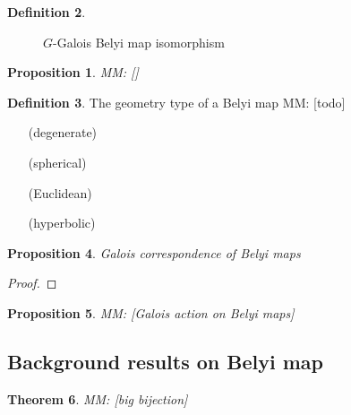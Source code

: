 \documentclass{dcthesis}
\newcommand{\PP}{\mathbb P}
\newcommand{\defi}[1]{\textsf{#1}}
\newcommand{\mm}[1]{{\color{blue} \sf MM: [#1]}}
\newtheorem{prop}{Proposition}[section]
\newtheorem{theorem}[prop]{Theorem}
\theoremstyle{definition}
\newtheorem{definition}[prop]{Definition}
\theoremstyle{remark}
\numberwithin{equation}{section}
\numberwithin{figure}{section}
\begin{document}
{{{\begin{definition}
        \begin{figure}[ht]
          \begin{center}
          \end{center}
          \caption{$G$-Galois Belyi map isomorphism}
          \label{fig:Gbelyiiso}
        \end{figure}
        \begin{prop}\label{prop:Gauts}
          \mm{\cite[Prop. 3.6 ish]{triangles}}
        \end{prop}
      \end{definition}
      \begin{definition}\label{def:geometrytype}
        The \defi{geometry type} of a Belyi map
        \mm{todo}
        \begin{enumerate}
          \item[(degenerate)]
          \item[(spherical)]
          \item[(Euclidean)]
          \item[(hyperbolic)]
        \end{enumerate}
      \end{definition}
      \begin{prop}\label{prop:galoiscorrespondence}
        Galois correspondence of Belyi maps
      \end{prop}
      \begin{proof}
      \end{proof}
      \begin{prop}\label{prop:galoisaction}
        \mm{Galois action on Belyi maps}
      \end{prop}
    }
    \subsection{Background results on Belyi map}{\label{subsec:backgroundresults}
      \begin{theorem}\label{thm:bigbijection}
        \mm{big bijection}
      \end{theorem}
    }
}}
\end{document}
